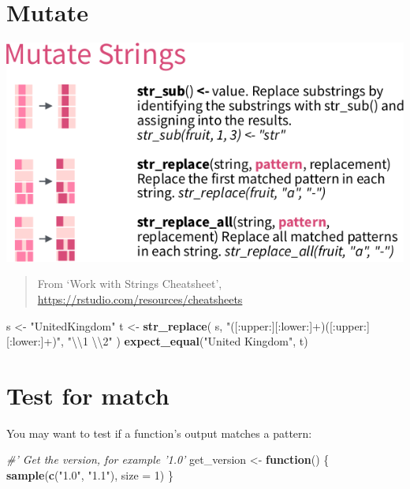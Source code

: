 \documentclass[]{book}
\newenvironment{Shaded}{}{}
\newcommand{\CharTok}[1]{\textcolor[rgb]{0.25,0.44,0.63}{#1}}
\newcommand{\CommentTok}[1]{\textcolor[rgb]{0.38,0.63,0.69}{\textit{#1}}}
\newcommand{\ControlFlowTok}[1]{\textcolor[rgb]{0.00,0.44,0.13}{\textbf{#1}}}
\newcommand{\DataTypeTok}[1]{\textcolor[rgb]{0.56,0.13,0.00}{#1}}
\newcommand{\DecValTok}[1]{\textcolor[rgb]{0.25,0.63,0.44}{#1}}
\newcommand{\KeywordTok}[1]{\textcolor[rgb]{0.00,0.44,0.13}{\textbf{#1}}}
\newcommand{\NormalTok}[1]{#1}
\newcommand{\StringTok}[1]{\textcolor[rgb]{0.25,0.44,0.63}{#1}}
\begin{document}
\hypertarget{mutate}{%
\section{Mutate}\label{mutate}}

\includegraphics{data/06_mutate.png}

\begin{quote}
From `Work with Strings Cheatsheet', \url{https://rstudio.com/resources/cheatsheets}
\end{quote}

\begin{Shaded}
\begin{Highlighting}[]
\NormalTok{s <-}\StringTok{ "UnitedKingdom"}
\NormalTok{t <-}\StringTok{ }\KeywordTok{str_replace}\NormalTok{(}
\NormalTok{  s,}
  \StringTok{"([:upper:][:lower:]+)([:upper:][:lower:]+)"}\NormalTok{,}
  \StringTok{"}\CharTok{\textbackslash{}\textbackslash{}}\StringTok{1 }\CharTok{\textbackslash{}\textbackslash{}}\StringTok{2"}
\NormalTok{)}
\KeywordTok{expect_equal}\NormalTok{(}\StringTok{"United Kingdom"}\NormalTok{, t)}
\end{Highlighting}
\end{Shaded}

\hypertarget{test-for-match}{%
\section{Test for match}\label{test-for-match}}

You may want to test if a function's output matches
a pattern:

\begin{Shaded}
\begin{Highlighting}[]
\CommentTok{#' Get the version, for example '1.0'}
\NormalTok{get_version <-}\StringTok{ }\ControlFlowTok{function}\NormalTok{() \{}
  \KeywordTok{sample}\NormalTok{(}\KeywordTok{c}\NormalTok{(}\StringTok{"1.0"}\NormalTok{, }\StringTok{"1.1"}\NormalTok{), }\DataTypeTok{size =} \DecValTok{1}\NormalTok{)}
\NormalTok{\}}
\end{Highlighting}
\end{Shaded}
\end{document}
